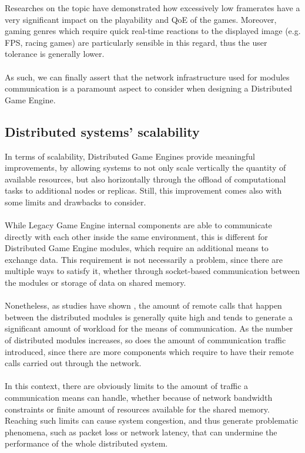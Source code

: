 Researches on the topic \cite{womak:framerate-player-FPS} have demonstrated how excessively low framerates have a very significant impact on the playability and QoE of the games. Moreover, gaming genres which require quick real-time reactions to the displayed image (e.g. FPS, racing games) are particularly sensible in this regard, thus the user tolerance is generally lower. \\ \\
As such, we can finally assert that the network infrastructure used for modules communication is a paramount aspect to consider when designing a Distributed Game Engine.

\subsection{Distributed systems' scalability}
In terms of scalability, Distributed Game Engines provide meaningful improvements, by allowing systems to not only scale vertically the quantity of available resources, but also horizontally through the offload of computational tasks to additional nodes or replicas. Still, this improvement comes also with some limits and drawbacks to consider. \\ \\
While Legacy Game Engine internal components are able to communicate directly with each other inside the same environment, this is different for Distributed Game Engine modules, which require an additional means to exchange data. This requirement is not necessarily a problem, since there are multiple ways to satisfy it, whether through socket-based communication between the modules or storage of data on shared memory. \\ \\ Nonetheless, as studies have shown \cite{womak:tame-efficient-task-allocation, womak:rafting-multiplayer-games, womak:distributed-minecraft}, the amount of remote calls that happen between the distributed modules is generally quite high and tends to generate a significant amount of workload for the means of communication. As the number of distributed modules increases, so does the amount of communication traffic introduced, since there are more components which require to have their remote calls carried out through the network. \\ \\
In this context, there are obviously limits to the amount of traffic a communication means can handle, whether because of network bandwidth constraints or finite amount of resources available for the shared memory. Reaching such limits can cause system congestion, and thus generate problematic phenomena, such as packet loss or network latency, that can undermine the performance of the whole distributed system. \\ \\
